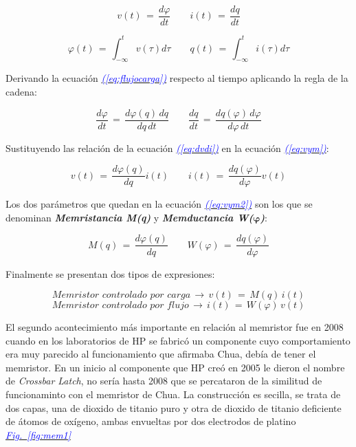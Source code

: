 \documentclass[12pt,a4paper]{report} %
\newcommand{\fref}[1]{\hyperref[#1]{\textcolor{blue}{\textit{Fig.~\ref*{#1}}}}}
\newcommand{\eref}[1]{\hyperref[#1]{\textcolor{blue}{\textit{(\ref*{#1})}}}}
\begin{document}
	\begin{equation}
		v(t)\,=\,\frac{d\varphi}{dt} \qquad i(t)\,=\,\frac{dq}{dt}
		\label{eq:dvdi}
	\end{equation}
			
	\begin{equation}
		\varphi(t)\,=\,\int_{-\infty}^{t}v(\tau)d\tau \qquad q(t)\,=\,\int_{-\infty}^{t}i(\tau)d\tau
		\label{eq:flujocargaintegral}
	\end{equation}\smallskip
	
	Derivando la ecuación \eref{eq:flujocarga} respecto al tiempo aplicando la regla de la cadena:
	
	\begin{equation}
		\frac{d\varphi}{dt}\,=\,\frac{d\varphi(q)\,dq}{dq\,dt} \qquad \frac{dq}{dt}\,=\,\frac{dq(\varphi)\,d\varphi}{d\varphi\,dt}
		\label{eq:vym}
	\end{equation}\smallskip
	
	Sustituyendo las relación de la ecuación \eref{eq:dvdi} en la ecuación \eref{eq:vym}:
	
	\begin{equation}
		v(t)\,=\,\frac{d\varphi(q)}{dq}i(t) \qquad i(t)\,=\,\frac{dq(\varphi)}{d\varphi}v(t)
		\label{eq:vym2}
	\end{equation}\smallskip
	
	Los dos parámetros que quedan en la ecuación \eref{eq:vym2} son los que se denominan \textbf{\textit{Memristancia M(q)}} y \textbf{\textit{Memductancia W($\bm{\varphi}$)}}: 
	
	\begin{equation}
		M(q)\,=\,\frac{d\varphi(q)}{dq} \qquad W(\varphi)\,=\,\frac{dq(\varphi)}{d\varphi}
		\label{eq:myw}
	\end{equation}\smallskip
	
	Finalmente se presentan dos tipos de expresiones:
	
	\begin{equation}
		\textit{Memristor controlado por carga} \, \rightarrow \, v(t)\,=\,M(q)\,i(t)
		\label{eq:cc}
	\end{equation}\smallskip
	\begin{equation}
		\textit{Memristor controlado por flujo} \, \rightarrow \, i(t)\,=\,W(\varphi)\,v(t)
		\label{eq:fc}
	\end{equation}\smallskip

	
	
	\newpage
	
	El segundo acontecimiento más importante en relación al memristor fue en 2008 cuando en los laboratorios de HP se fabricó un componente cuyo comportamiento era muy parecido al funcionamiento que afirmaba Chua, debía de tener el memristor. En un inicio al componente que HP creó en 2005 le dieron el nombre de \textit{Crossbar Latch}, no sería hasta 2008 que se percataron de la similitud de funcionaminto con el memristor de Chua. La construcción es secilla, se trata de dos capas, una de dioxido de titanio puro y otra de dioxido de titanio deficiente de átomos de oxígeno, ambas envueltas por dos electrodos de platino \fref{fig:mem1}
	
\end{document}
